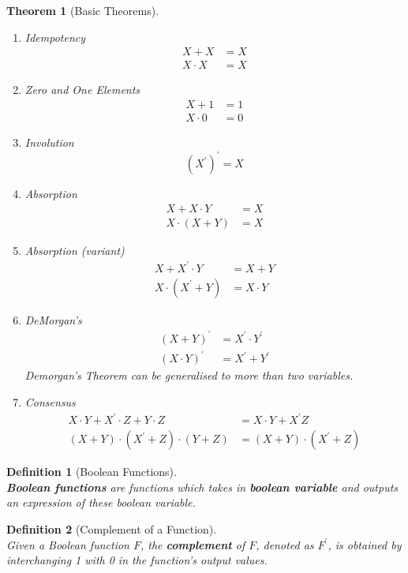 \documentclass[12pt]{article}
\newtheorem{definition}{Definition}[section]
\newtheorem{theorem}{Theorem}[section]
\theoremstyle{definition}
\begin{document}
\begin{theorem}[Basic Theorems]
\hfill\\\normalfont 
\begin{enumerate}
  \item Idempotency
  \begin{align*}
X+X&=X\\
X\cdot X &= X
  \end{align*}
  \item Zero and One Elements
  \begin{align*}
X+1&=1\\X\cdot 0 &= 0
  \end{align*}
  \item Involution
  \[
(X^\prime)^\prime = X
  \]
  \item Absorption
  \begin{align*}
X+X\cdot Y &= X\\X\cdot(X+Y)&=X 
  \end{align*}
  \item Absorption (variant)
  \begin{align*}
X+X^\prime \cdot Y &= X+Y\\X\cdot(X^\prime + Y)&=X\cdot Y
  \end{align*}
  \item DeMorgan's
  \begin{align*}
(X+Y)^\prime &= X^\prime\cdot Y^\prime\\(X\cdot Y)^\prime &= X^\prime + Y^\prime
  \end{align*}
  Demorgan's Theorem can be generalised to more than two variables.
  \item Consensus
  \begin{align*}
X\cdot Y+X^\prime \cdot Z + Y\cdot Z &= X\cdot Y + X^\prime Z\\(X+Y)\cdot(X^\prime+Z)\cdot(Y+Z)&=(X+Y)\cdot(X^\prime+Z)
  \end{align*}
\end{enumerate}
\end{theorem}
\begin{definition}[Boolean Functions]
\hfill\\\normalfont \textbf{Boolean functions} are functions which takes in \textbf{boolean variable} and outputs an expression of these boolean variable.
\end{definition}
\begin{definition}[Complement of a Function]
\hfill\\\normalfont Given a Boolean function $F$, the \textbf{complement} of $F$, denoted as $F^\prime$, is obtained by interchanging 1 with 0 in the function's output values.
\end{definition}
\end{document}
